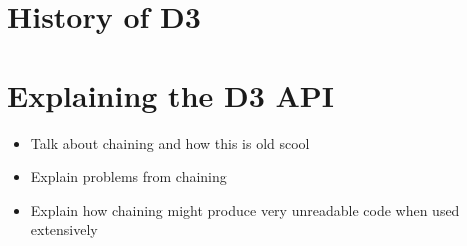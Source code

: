 
\section{History of D3}


\section{Explaining the D3 API} 

\begin{itemize}
    \item Talk about chaining and how this is old scool
    \item Explain problems from chaining
    \item Explain how chaining might produce very unreadable code when used extensively
\end{itemize}